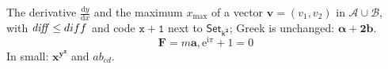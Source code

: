\documentclass[11pt]{article}
\begin{document}
The derivative $\frac{\mathrm{d}y}{\mathrm{d}x}$ and the maximum $x_\mathrm{max}$ of a vector
$\mathbf{v} = (v_1, v_2)$ in $\mathcal{A}\cup\mathcal{B}$, with $\mathit{diff} \leq \mathnormal{diff}$
and code $\mathtt{x+1}$ next to $\mathsf{Set}_{\mathsf{k}^{\mathbf{2}}}$; Greek is unchanged: $\mathbf{\alpha + 2b}$.
\begin{equation}
  \mathbf{F} = m\mathbf{a}, \mathrm{e}^{\mathrm{i}\pi} + 1 = 0 \label{eq:f}
\end{equation}
{\small In small: $\mathbf{x}^{\mathbf{y}^{\mathbf{z}}}$ and $\mathit{ab}_{\mathit{cd}}$.}
\end{document}
